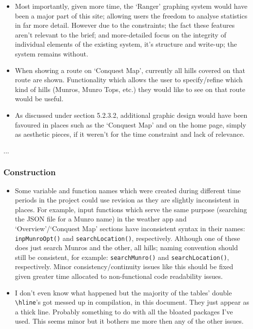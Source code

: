 \documentclass[11pt, english]{article}
\begin{document}
	\begin{itemize}
	\setlength\itemsep{0cm}
		\item Most importantly, given more time, the `Ranger' graphing system would have been a major part of this site; allowing users the freedom to analyse statistics in far more detail. However due to the constraints; the fact these features aren't relevant to the brief; and more-detailed focus on the integrity of individual elements of the existing system, it's structure and write-up; the system remains without.\\
		\item When showing a route on `Conquest Map', currently all hills covered on that route are shown. Functionality which allows the user to specify/refine which kind of hills (Munros, Munro Tops, etc.) they would like to see on that route would be useful.
		\item As discussed under section 5.2.3.2, additional graphic design would have been favoured in places such as the `Conquest Map' and on the home page, simply as aesthetic pieces, if it weren't for the time constraint and lack of relevance.
	\end{itemize}
	
	...

		\subsubsection{Construction}

	\begin{itemize}
	\setlength\itemsep{0cm}
		\item Some variable and function names which were created during different time periods in the project could use revision as they are slightly inconsistent in places. For example, input functions which serve the same purpose (searching the JSON file for a Munro name) in the weather app and `Overview'/`Conquest Map' sections have inconsistent syntax in their names: \texttt{inpMunroOpt()} and \texttt{searchLocation()}, respectively. Although one of these does just search Munros and the other, all hills; naming convention should still be consistent, for example: \texttt{searchMunro()} and \texttt{searchLocation()}, respectively. Minor consistency/continuity issues like this should be fixed given greater time allocated to non-functional code readability issues.\\
		\item I don't even know what happened but the majority of the tables' double \verb|\hline|'s got messed up in compilation, in this document. They just appear as a thick line. Probably something to do with all the bloated packages I've used. This seems minor but it bothers me more then any of the other issues.
	\end{itemize}
\end{document}
